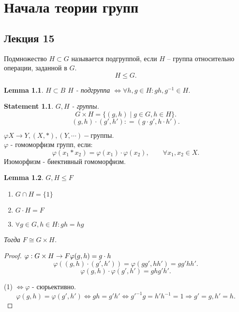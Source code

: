 \documentclass[11pt]{book}
\theoremstyle{definition}
\theoremstyle{plain}
\theoremstyle{plain}
\newtheorem*{lm}{Lemma}
\newtheorem*{st}{Statement}
\theoremstyle{definition}
\theoremstyle{remark}
\begin{document}
\chapter{Начала теории групп}
\section{Лекция 15}
\begin{defn}
    Подмножество $H \subset G$ называется подгруппой, если $H$ -- группа относительно операции, заданной в $G$.
    \[
    H \le G
    .\] 
\end{defn}
\begin{lm}
    $H \subset B$
    $H$ - подгруппа $\Leftrightarrow \forall h, g \in H: gh, g^{-1} \in  H$.
\end{lm}
\begin{st}
    $G, H$ - группы. 
    \[
	G \times H = \{(g, h) \mid g \in  G, h \in  H \}
    .\] 
    \[
     (g, h) \cdot (g', h') : = (g\cdot g', h\cdot h')
    .\] 
\end{st}
\begin{defn}
    $\varphi  X \to  Y , (X, *), (Y, \cdots) - группы.$\\
    $\varphi$ - гомоморфизм групп, если:
    \[
	\varphi(x_1 * x_2) = \varphi (x_1) \cdot \varphi(x_2) , \qquad \forall x_1, x_2 \in  X
    .\] 
    Изоморфизм - биективный гомоморфизм.
\end{defn}
\begin{lm}
    $G, H \le F$
    \begin{enumerate}
	\item $G \cap H  = \{1\}$
	\item $G \cdot H = F$
	\item $\forall g \in  G, h \in  H: gh = hg$
    \end{enumerate}
    Тогда $F \cong G \times H$.
\end{lm}
\begin{proof}
$
    \varphi : G\times H \to F \\ \varphi(g, h) = g \cdot h$
    \[
	\varphi ((g, h) \cdot (g', h')) = \varphi (gg', hh') = gg' hh'
    .\] 
    \[
	\varphi (g, h) \cdot \varphi (g', h') = gh g'h'
    .\] 

    (1) $\Leftrightarrow \varphi$ - сюрьективно.
    \[
	\varphi (g, h) = \varphi(g', h') \Leftrightarrow gh = g'h' \Leftrightarrow g'^{-1} g = h' h^{-1} = 1 \Rightarrow g' = g, h' = h
    .\] 
\end{proof}
\end{document}
